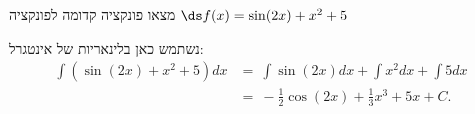 מצאו פונקציה קדומה לפונקציה
$\ds f(x)=\sin(2x)+x^2+5$
\begin{solbox}
נשתמש כאן בלינאריות של אינטגרל:
\begin{align*}
    \int(\sin(2x)+x^2+5)dx&=\ \int\sin(2x)dx+\int x^2dx+\int5dx\\
    &=\ -\frac{1}{2}\cos(2x)+\frac{1}{3}x^3+5x+C.
\end{align*}
\end{solbox}
